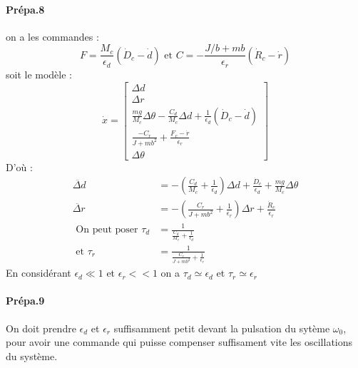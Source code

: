 \documentclass[10pt,a4paper,notitlepage]{article}
\begin{document}
\paragraph{Prépa.8} on a les commandes :
\begin{equation}
  F=\frac{M_{c}}{\epsilon_{d}}\left(\dot{D}_{c}-\dot{d}\right) \text{ et } C=-\frac{J / b+m b}{\epsilon_{r}}\left(\dot{R}_{c}-\dot{r}\right)
\end{equation}
soit le modèle :
\begin{equation}
  \dot{x}=\left[ \begin{array}{c}{\Delta d} \\ {\Delta r} \\ {\frac{m g}{M_{c}} \Delta \theta-\frac{C_{d}}{M_{c}} \Delta d+\frac{1}{\epsilon_{d}}\left(\dot{D}_{c}-\dot{d}\right)} \\ {\frac{-C_{r}}{J+m b^{2}}+\frac{F_{c}-\dot{r}}{\epsilon_{r}}} \\ {\Delta \theta}\end{array}\right]
\end{equation}
D'où :
\begin{equation}
  \begin{aligned}
    \ddot{\Delta d} &=-\left(\frac{C_{d}}{M_{c}}+\frac{1}{\epsilon_{d}}\right) \Delta d+\frac{\dot{D}_{c}}{\epsilon_{d}}+\frac{m g}{M_{c}} \Delta \theta \\
    \ddot{\Delta r} &=-\left(\frac{C_{r}}{J+m b^{2}}+\frac{1}{\epsilon_{r}}\right) \Delta r+\frac{\dot{R}_{c}}{\epsilon_{r}} \\
    \text { On peut poser } \tau_{d} &=\frac{1}{\frac{C_{d}}{M_{c}}+\frac{1}{\epsilon_{d}}} \\
    \text { et } \tau_{r} &=\frac{1}{\frac{C_{r}}{J+m b^{2}}+\frac{1}{\epsilon_{r}}}
  \end{aligned}
\end{equation}
En considérant $\epsilon_d \ll 1 $ et $\epsilon_r <<1 $ on a $\tau_d \simeq \epsilon_d$ et $\tau_r \simeq \epsilon_r$

\paragraph{Prépa.9}
On doit prendre  $\epsilon_d$ et $\epsilon_r$ suffisamment petit devant la pulsation du sytème $\omega_0$, pour avoir une commande qui puisse  compenser suffisament vite les oscillations du système.
\end{document}
